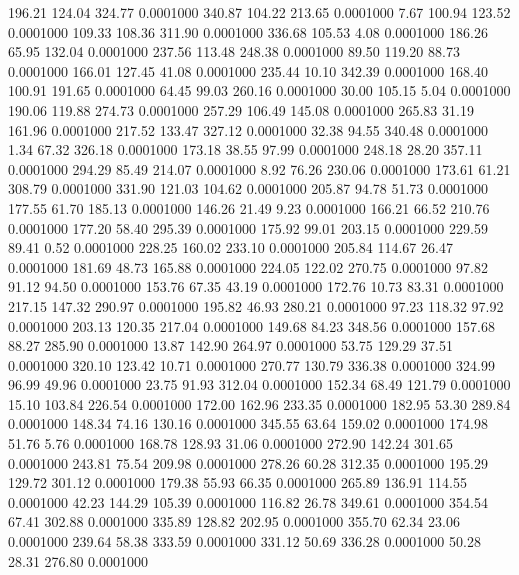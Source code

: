  196.21  124.04  324.77   0.0001000
 340.87  104.22  213.65   0.0001000
   7.67  100.94  123.52   0.0001000
 109.33  108.36  311.90   0.0001000
 336.68  105.53    4.08   0.0001000
 186.26   65.95  132.04   0.0001000
 237.56  113.48  248.38   0.0001000
  89.50  119.20   88.73   0.0001000
 166.01  127.45   41.08   0.0001000
 235.44   10.10  342.39   0.0001000
 168.40  100.91  191.65   0.0001000
  64.45   99.03  260.16   0.0001000
  30.00  105.15    5.04   0.0001000
 190.06  119.88  274.73   0.0001000
 257.29  106.49  145.08   0.0001000
 265.83   31.19  161.96   0.0001000
 217.52  133.47  327.12   0.0001000
  32.38   94.55  340.48   0.0001000
   1.34   67.32  326.18   0.0001000
 173.18   38.55   97.99   0.0001000
 248.18   28.20  357.11   0.0001000
 294.29   85.49  214.07   0.0001000
   8.92   76.26  230.06   0.0001000
 173.61   61.21  308.79   0.0001000
 331.90  121.03  104.62   0.0001000
 205.87   94.78   51.73   0.0001000
 177.55   61.70  185.13   0.0001000
 146.26   21.49    9.23   0.0001000
 166.21   66.52  210.76   0.0001000
 177.20   58.40  295.39   0.0001000
 175.92   99.01  203.15   0.0001000
 229.59   89.41    0.52   0.0001000
 228.25  160.02  233.10   0.0001000
 205.84  114.67   26.47   0.0001000
 181.69   48.73  165.88   0.0001000
 224.05  122.02  270.75   0.0001000
  97.82   91.12   94.50   0.0001000
 153.76   67.35   43.19   0.0001000
 172.76   10.73   83.31   0.0001000
 217.15  147.32  290.97   0.0001000
 195.82   46.93  280.21   0.0001000
  97.23  118.32   97.92   0.0001000
 203.13  120.35  217.04   0.0001000
 149.68   84.23  348.56   0.0001000
 157.68   88.27  285.90   0.0001000
  13.87  142.90  264.97   0.0001000
  53.75  129.29   37.51   0.0001000
 320.10  123.42   10.71   0.0001000
 270.77  130.79  336.38   0.0001000
 324.99   96.99   49.96   0.0001000
  23.75   91.93  312.04   0.0001000
 152.34   68.49  121.79   0.0001000
  15.10  103.84  226.54   0.0001000
 172.00  162.96  233.35   0.0001000
 182.95   53.30  289.84   0.0001000
 148.34   74.16  130.16   0.0001000
 345.55   63.64  159.02   0.0001000
 174.98   51.76    5.76   0.0001000
 168.78  128.93   31.06   0.0001000
 272.90  142.24  301.65   0.0001000
 243.81   75.54  209.98   0.0001000
 278.26   60.28  312.35   0.0001000
 195.29  129.72  301.12   0.0001000
 179.38   55.93   66.35   0.0001000
 265.89  136.91  114.55   0.0001000
  42.23  144.29  105.39   0.0001000
 116.82   26.78  349.61   0.0001000
 354.54   67.41  302.88   0.0001000
 335.89  128.82  202.95   0.0001000
 355.70   62.34   23.06   0.0001000
 239.64   58.38  333.59   0.0001000
 331.12   50.69  336.28   0.0001000
  50.28   28.31  276.80   0.0001000
